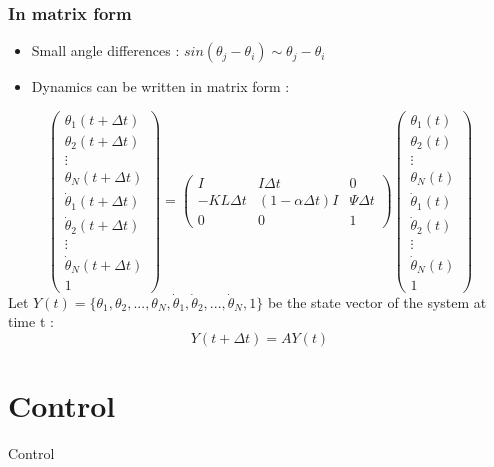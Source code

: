 \documentclass[xcolor=dvipsnames]{beamer}
\begin{document}
\begin{frame}
	\frametitle{In matrix form}
	\begin{small}
	\begin{itemize}
		\item Small angle differences : $sin(\theta_j - \theta_i) \sim \theta_j - \theta_i $
		\item Dynamics can be written in matrix form :
	\end{itemize}
	\end{small}
	\[ \left( \begin{array}{ccc}
\theta_1(t+\Delta t) \\
\theta_2(t+\Delta t) \\
\vdots \\
\theta_N(t+\Delta t) \\
\dot{\theta}_1(t+\Delta t) \\
\dot{\theta}_2(t+\Delta t) \\
\vdots \\
\dot{\theta}_N(t+\Delta t) \\
1 \end{array} \right) 
= 
\left( \begin{array}{ccc} 
I & I \Delta t & 0 \\ 
-KL \Delta t & (1-\alpha \Delta t)I & \Psi \Delta t \\ 
0&0&1 \end{array} \right)
\left( \begin{array}{ccc}
\theta_1(t) \\
\theta_2(t) \\
\vdots \\
\theta_N(t) \\
\dot{\theta}_1(t) \\
\dot{\theta}_2(t) \\
\vdots \\
\dot{\theta}_N(t) \\
1 \end{array} \right) \]
Let $ Y(t) = \{ \theta_1,\theta_2,...,\theta_N,\dot{\theta}_1,\dot{\theta}_2,...,\dot{\theta}_N,1\} $ be the state vector of the system at time t :
	\[ Y(t+\Delta t) = A Y(t) \]
\end{frame}

\section{Control}
\begin{frame}
	\begin{huge}
		\begin{center}
			Control
		\end{center}
	\end{huge}
\end{frame}
\end{document}
